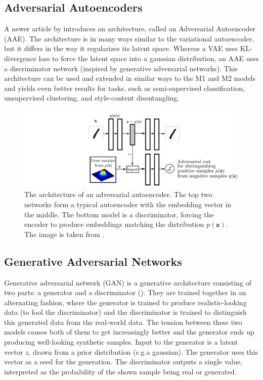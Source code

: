 \subsection{Adversarial Autoencoders}

A newer article by \cite{AdversarialAutoencoders} introduces an architecture, called an Adversarial Autoencoder (AAE). The architecture is in many ways similar to the variational autoencoder, but it differs in the way it regularizes its latent space. Whereas a VAE uses KL-divergence loss to force the latent space into a gaussian distribution, an AAE uses a discriminator network (inspired by generative adversarial networks). This architecture can be used and extended in similar ways to the M1 and M2 models and yields even better results for tasks, such as semi-supervised classification, unsupervised clustering, and style-content disentangling.

\begin{figure}[ht]
    \centering
    \includegraphics[width=145mm]{../img/aae.png}
    \caption{The architecture of an adversarial autoencoder. The top two networks form a typical autoencoder with the embedding vector in the middle. The bottom model is a discriminator, forcing the encoder to produce embeddings matching the distribution $p(\mathbf{z})$. The image is taken from \cite{AdversarialAutoencoders}.}
    \label{fig:AaeArchitecture}
\end{figure}


\subsection{Generative Adversarial Networks}

Generative adversarial network (GAN) is a generative architecture consisting of two parts: a generator and a discriminator (\cite{GAN}). They are trained together in an alternating fashion, where the generator is trained to produce realistic-looking data (to fool the discriminator) and the discriminator is trained to distinguish this generated data from the real-world data. The tension between these two models causes both of them to get increasingly better and the generator ends up producing well-looking synthetic samples. Input to the generator is a latent vector $z$, drawn from a prior distribution (e.g.\@ a gaussian). The generator uses this vector as a seed for the generation. The discriminator outputs a single value, interpreted as the probability of the shown sample being real or generated.

